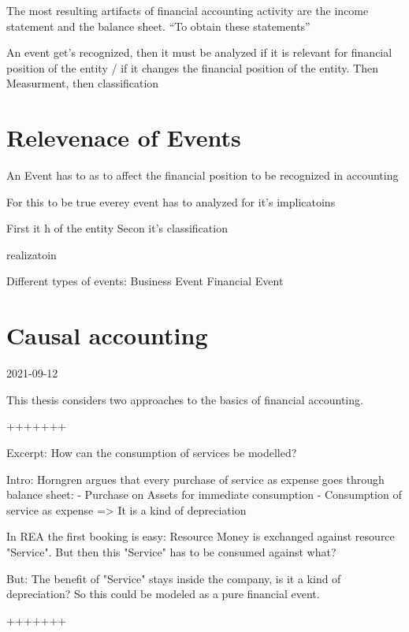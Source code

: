 The most resulting artifacts of financial accounting activity are the income statement and the balance sheet.
\enquote{To obtain these statements}





An event get's recognized, then it must be analyzed if it is relevant for financial position of the entity / if it changes the financial position of the entity.
Then Measurment, then classification

\section{Relevenace of Events }
An Event has to as to affect the financial position to be recognized in accounting 

For this to be true everey event has to analyzed for it's implicatoins

First it h of the entity
Secon it's classification 

realizatoin

Different types of events:
Business Event
Financial Event










\section{Causal accounting}

2021-09-12

This thesis considers two approaches to the basics of financial accounting.



+++++++

Excerpt: How can the consumption of services be modelled?

Intro: Horngren argues that every purchase of service as expense goes through balance sheet:
- Purchase on Assets for immediate consumption
- Consumption of service as expense
=> It is a kind of depreciation

In REA the first booking is easy:
Resource Money is exchanged against resource "Service".
But then this "Service" has to be consumed against what?

But: The benefit of "Service" stays inside the company, is it a kind of depreciation?
So this could be modeled as a pure financial event.

+++++++



